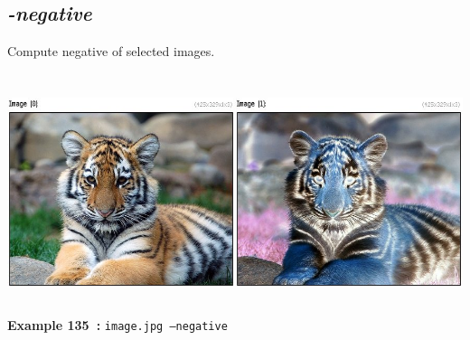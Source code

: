 \documentclass[a4paper,11pt,twoside]{book}
\begin{document}
\subsection{\emph{-negative} }\vspace*{-0.5em}
Compute negative of selected images.
\begin{center}\includegraphics[keepaspectratio=true,height=7cm,width=\textwidth]{img/gmic_def135.jpg}\\
{\footnotesize \textbf{Example 135~:} \texttt{image.jpg --negative}}
\end{center}
\end{document}
